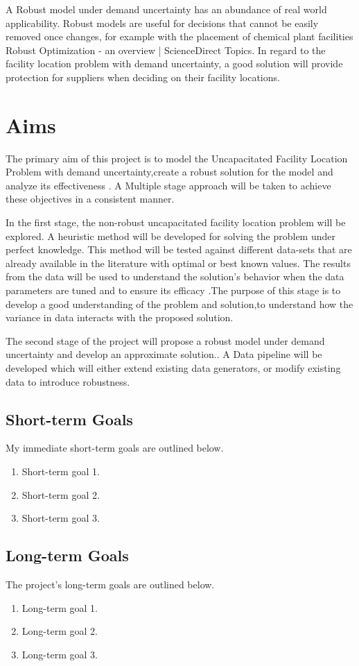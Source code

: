 \documentclass[10pt]{article}
\begin{document}
A Robust model under demand uncertainty has an abundance of real world applicability. Robust models are useful for decisions that cannot be easily removed once changes, for example with the placement of chemical plant facilities  Robust Optimization - an overview | ScienceDirect Topics. In regard to the facility location problem with  demand uncertainty, a good solution will provide protection for suppliers when deciding on their facility locations.  



\section{Aims}
The primary aim of this project is to model the Uncapacitated  Facility Location Problem with demand uncertainty,create a robust solution for the model and analyze its effectiveness . A Multiple stage approach will be taken to achieve these objectives in a consistent manner. 

In the first stage,  the non-robust uncapacitated facility location problem will be explored. A heuristic method will be developed for solving the problem under perfect knowledge. This method will be tested against different data-sets that are already available in the literature with optimal or best known values. The results from the data will be used to understand the solution’s behavior when the data parameters are tuned and to ensure its efficacy .The purpose of this stage is to develop a good understanding of the problem and solution,to understand how the variance in data interacts with the proposed solution. 

The second stage of the project will propose a robust model under demand uncertainty and develop an approximate solution.. A Data pipeline will be developed which will either extend existing data generators, or modify existing data to introduce robustness. 


\subsection{Short-term Goals}
\label{sec:shorttermgoals}
My immediate short-term goals are outlined below.
\begin{enumerate}
    \item Short-term goal 1.
    \item Short-term goal 2.
    \item Short-term goal 3.
\end{enumerate}

\subsection{Long-term Goals}
\label{sec:longtermgoals}
The project's long-term goals are outlined below.
\begin{enumerate}
    \item Long-term goal 1.
    \item Long-term goal 2.
    \item Long-term goal 3.
\end{enumerate}


\newpage
\printbibliography
\end{document}
